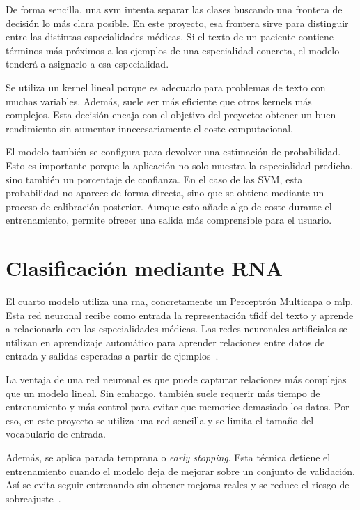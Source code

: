 De forma sencilla, una \gls{svm} intenta separar las clases buscando una frontera de decisión lo más clara posible. En este proyecto, esa frontera sirve para distinguir entre las distintas especialidades médicas. Si el texto de un paciente contiene términos más próximos a los ejemplos de una especialidad concreta, el modelo tenderá a asignarlo a esa especialidad.

Se utiliza un kernel lineal porque es adecuado para problemas de texto con muchas variables. Además, suele ser más eficiente que otros kernels más complejos. Esta decisión encaja con el objetivo del proyecto: obtener un buen rendimiento sin aumentar innecesariamente el coste computacional.

El modelo también se configura para devolver una estimación de probabilidad. Esto es importante porque la aplicación no solo muestra la especialidad predicha, sino también un porcentaje de confianza. En el caso de las SVM, esta probabilidad no aparece de forma directa, sino que se obtiene mediante un proceso de calibración posterior. Aunque esto añade algo de coste durante el entrenamiento, permite ofrecer una salida más comprensible para el usuario.

\section{Clasificación mediante RNA}

El cuarto modelo utiliza una \gls{rna}, concretamente un Perceptrón Multicapa o \gls{mlp}. Esta red neuronal recibe como entrada la representación \gls{tfidf} del texto y aprende a relacionarla con las especialidades médicas. Las redes neuronales artificiales se utilizan en aprendizaje automático para aprender relaciones entre datos de entrada y salidas esperadas a partir de ejemplos~\cite{ibm_redes_neuronales, cienciadedatos_redes_neuronales}.

La ventaja de una red neuronal es que puede capturar relaciones más complejas que un modelo lineal. Sin embargo, también suele requerir más tiempo de entrenamiento y más control para evitar que memorice demasiado los datos. Por eso, en este proyecto se utiliza una red sencilla y se limita el tamaño del vocabulario de entrada.

Además, se aplica parada temprana o \textit{early stopping}. Esta técnica detiene el entrenamiento cuando el modelo deja de mejorar sobre un conjunto de validación. Así se evita seguir entrenando sin obtener mejoras reales y se reduce el riesgo de sobreajuste~\cite{aws_sobreajuste}.

